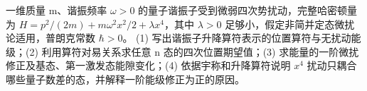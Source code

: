 一维质量 m、谐振频率 \(\omega >0\) 的量子谐振子受到微弱四次势扰动，完整哈密顿量为 \(H=p^{2}/(2m)+m\omega ^{2}x^{2}/2+\lambda x^{4}\)，其中 \(\lambda >0\) 足够小，假定非简并定态微扰论适用，普朗克常数 \(\hbar >0\)。
(1) 写出谐振子升降算符表示的位置算符与无扰动能级；(2) 利用算符对易关系求任意 n 态的四次位置期望值；(3) 求能量的一阶微扰修正及基态、第一激发态能隙变化；(4) 依据宇称和升降算符说明 \(x^{4}\) 扰动只耦合哪些量子数差的态，并解释一阶能级修正为正的原因。
